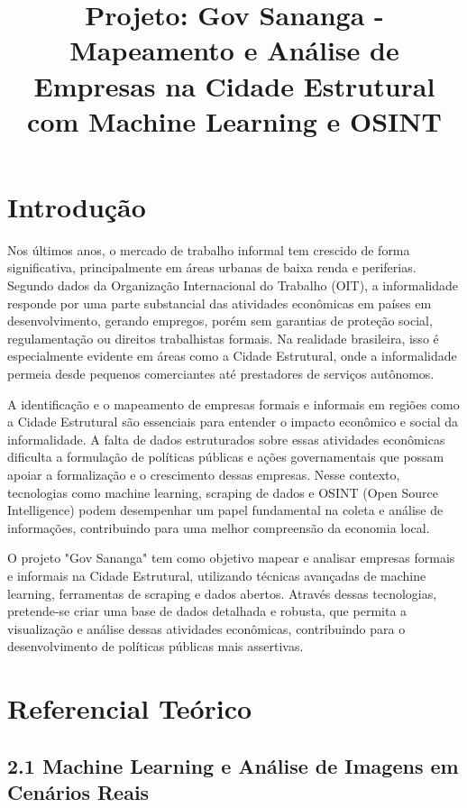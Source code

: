 \documentclass{article}
\title{Projeto: Gov Sananga - Mapeamento e Análise de Empresas na Cidade Estrutural com Machine Learning e OSINT}
\author{}
\date{}
\begin{document}
\maketitle

\section*{Introdução}

Nos últimos anos, o mercado de trabalho informal tem crescido de forma significativa, principalmente em áreas urbanas de baixa renda e periferias. Segundo dados da Organização Internacional do Trabalho (OIT), a informalidade responde por uma parte substancial das atividades econômicas em países em desenvolvimento, gerando empregos, porém sem garantias de proteção social, regulamentação ou direitos trabalhistas formais. Na realidade brasileira, isso é especialmente evidente em áreas como a Cidade Estrutural, onde a informalidade permeia desde pequenos comerciantes até prestadores de serviços autônomos.

A identificação e o mapeamento de empresas formais e informais em regiões como a Cidade Estrutural são essenciais para entender o impacto econômico e social da informalidade. A falta de dados estruturados sobre essas atividades econômicas dificulta a formulação de políticas públicas e ações governamentais que possam apoiar a formalização e o crescimento dessas empresas. Nesse contexto, tecnologias como machine learning, scraping de dados e OSINT (Open Source Intelligence) podem desempenhar um papel fundamental na coleta e análise de informações, contribuindo para uma melhor compreensão da economia local.

O projeto "Gov Sananga" tem como objetivo mapear e analisar empresas formais e informais na Cidade Estrutural, utilizando técnicas avançadas de machine learning, ferramentas de scraping e dados abertos. Através dessas tecnologias, pretende-se criar uma base de dados detalhada e robusta, que permita a visualização e análise dessas atividades econômicas, contribuindo para o desenvolvimento de políticas públicas mais assertivas.

\section*{Referencial Teórico}

\subsection*{2.1 Machine Learning e Análise de Imagens em Cenários Reais}
\end{document}
